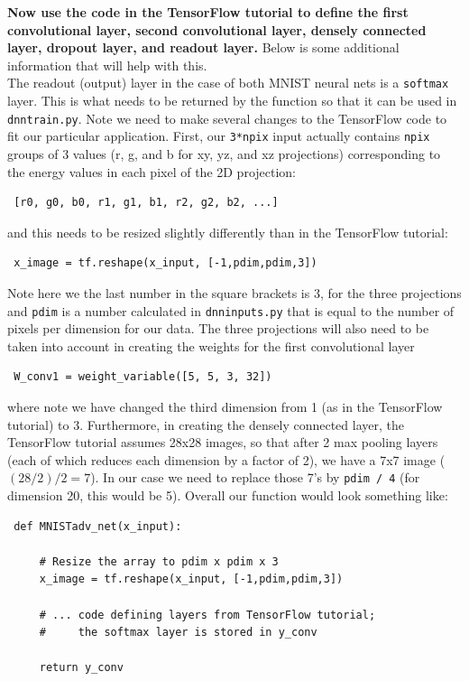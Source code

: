 \documentclass[10pt]{article}
\begin{document}
\noindent \textbf{Now use the code in the TensorFlow tutorial to define the first convolutional layer, second convolutional layer, densely connected layer, dropout layer, and readout layer.}  Below is some additional information that will help with this.\\

\noindent The readout 
(output) layer in the case of both MNIST neural nets is a \verb|softmax| layer.  This is what needs to be returned by the function so that it can be used in \verb|dnntrain.py|.  Note we need to
make several changes to the TensorFlow code to fit our particular application.  First, our \verb|3*npix| input actually contains \verb|npix| groups of 3 values (r, g, and b for xy, yz, and xz projections) corresponding 
to the energy values in each pixel of the 2D projection:

\begin{verbatim}
 [r0, g0, b0, r1, g1, b1, r2, g2, b2, ...]
\end{verbatim}

\noindent and this needs to be resized slightly differently than in the TensorFlow tutorial:

\begin{verbatim}
 x_image = tf.reshape(x_input, [-1,pdim,pdim,3])
\end{verbatim}

\noindent Note here we the last number in the square brackets is 3, for the three projections and \verb|pdim| is a number calculated in \verb|dnninputs.py| that is equal to the number of
pixels per dimension for our data.  The three projections will also need to be taken into account in creating the weights for the first convolutional layer

\begin{verbatim}
 W_conv1 = weight_variable([5, 5, 3, 32])
\end{verbatim}

\noindent where note we have changed the third dimension from 1 (as in the TensorFlow tutorial)  to 3.  Furthermore, in creating the densely connected layer, the TensorFlow tutorial assumes 
28x28 images, so that after 2 max pooling layers (each of which reduces each dimension
by a factor of 2), we have a 7x7 image ($(28 / 2) / 2 = 7$).  In our case we need to replace those 7's by \verb|pdim / 4| (for dimension 20, this would be 5).  Overall our function would
look something like:
\newpage
\begin{verbatim}
 def MNISTadv_net(x_input):

     # Resize the array to pdim x pdim x 3
     x_image = tf.reshape(x_input, [-1,pdim,pdim,3])
     
     # ... code defining layers from TensorFlow tutorial; 
     #     the softmax layer is stored in y_conv
     
     return y_conv
\end{verbatim}
\end{document}
